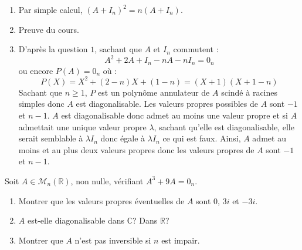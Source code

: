 \documentclass[a4paper,10pt]{report}
\begin{document}
\corr 
\begin{enumerate}
\item Par simple calcul, $(A+I_n)^2 = n (A+I_n)$.
\item Preuve du cours.
\item D'après la question $1$, sachant que $A$ et $I_n$ commutent :
$$ A^2 +2A+I_n -nA-nI_n=0_n$$
ou encore $P(A)=0_n$ où :
$$ P(X)=X^2+(2-n)X+(1-n) = (X+1)(X+1-n)$$
Sachant que $n \geq 1$, $P$ est un polynôme annulateur de $A$ scindé à racines simples donc $A$ est diagonalisable. Les valeurs propres possibles de $A$ sont $-1$ et $n-1$. $A$ est diagonalisable donc admet au moins une valeur propre et si $A$ admettait une unique valeur propre $\lambda$, sachant qu'elle est diagonalisable, elle serait semblable à $\lambda I_n$ donc égale à $\lambda I_n$ ce qui est faux. Ainsi, $A$ admet au moins et au plus deux valeurs propres donc les valeurs propres de $A$ sont $-1$ et $n-1$.
\end{enumerate}

\begin{Exa} Soit $A \in \mathcal{M}_n(\mathbb{R})$, non nulle, vérifiant $A^3+9A=0_n$.
\begin{enumerate}
\item Montrer que les valeurs propres éventuelles de $A$ sont $0$, $3i$ et $-3i$.
\item $A$ est-elle diagonalisable dans $\mathbb{C}$? Dans $\mathbb{R}$?
\item Montrer que $A$ n'est pas inversible si $n$ est impair. 
\end{enumerate}
\end{Exa}
\end{document}
